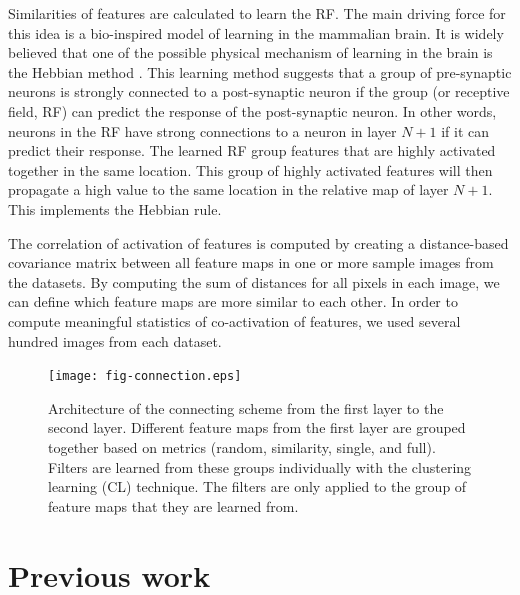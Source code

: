 \documentclass{article} %
\begin{document}
Similarities of features are calculated to learn the RF. 
The main driving force for this idea is a bio-inspired model of learning in the mammalian brain.
It is widely believed that one of the possible physical mechanism of learning in the brain is the Hebbian method \cite{masquelier2007learning}.
This learning method suggests that a group of pre-synaptic neurons is strongly connected to a post-synaptic neuron if the group
(or receptive field, RF) can predict the response of the post-synaptic neuron.
In other words, neurons in the RF have strong connections to a neuron in layer $N+1$ if it can predict their response.
The learned RF group features that are highly activated together in the same location.
This group of highly activated features will then propagate a high value to the same location in the relative map of layer $N+1$.
This implements the Hebbian rule.

The correlation of activation of features is computed by creating a distance-based covariance matrix between all feature maps in one or more sample images from the datasets. By computing the sum of distances for all pixels in each image, we can define which feature maps are more similar to each other. In order to compute meaningful statistics of co-activation of features, we used several hundred images from each dataset.


\begin{figure}
\texttt{[image: fig-connection.eps]}
\caption{Architecture of the connecting scheme from the first layer to the second layer. 
Different feature maps from the first layer are grouped together based on metrics (random, similarity, single, and full). 
Filters are learned from these groups individually with the clustering learning (CL) technique.
The filters are only applied to the group of feature maps that they are learned from.}
\label{fig-learnlayers}
\end{figure}


\section{Previous work}
\label{sec-priorart}
\end{document}
